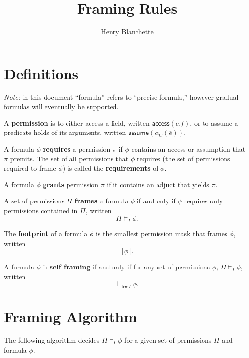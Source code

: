 \documentclass{article}
\title{Framing Rules}
\author{Henry Blanchette}
\date{}
\newcommand{\tsf}{\textsf}
\newcommand{\access}{\tsf{access}}
\newcommand{\assume}{\tsf{assume}}
\newcommand{\footprint}[1]{\lfloor #1 \rfloor}
\newcommand{\frames}{\vDash_I}
\newcommand{\selfframes}{\vdash_{\tsf{frm}I}}
\begin{document}
\maketitle

\section{Definitions}

\textit{Note:} in this document ``formula'' refers to ``precise formula,'' however gradual formulas will eventually be supported.

\noindent
A \textbf{permission} is to either access a field, written $\access(e.f)$, or to assume a predicate holds of its arguments, written $\assume(\alpha_C(\overline{e}))$.

\noindent
A formula $\phi$ \textbf{requires} a permission $\pi$ if $\phi$ contains an access or assumption that $\pi$ premits. The set of all permissions that $\phi$ requires (the set of permissions required to frame $\phi$) is called the \textbf{requirements} of $\phi$.

\noindent
A formula $\phi$ \textbf{grants} permission $\pi$ if it contains an adjuct that yields $\pi$.

\noindent
A set of permissions $\Pi$ \textbf{frames} a formula $\phi$ if and only if $\phi$ requires only permissions contained in $\Pi$, written $$ \Pi \frames \phi. $$

\noindent
The \textbf{footprint} of a formula $\phi$ is the smallest permission mask that frames $\phi$, written $$ \footprint \phi. $$

\noindent
A formula $\phi$ is \textbf{self-framing} if and only if for any set of permissions $\phi$, $\Pi \frames \phi$, written $$ \selfframes \phi. $$

\newpage
\section{Framing Algorithm}

The following algorithm decides $\Pi \frames \phi$ for a given set of permissions $\Pi$ and formula $\phi$.
\end{document}

